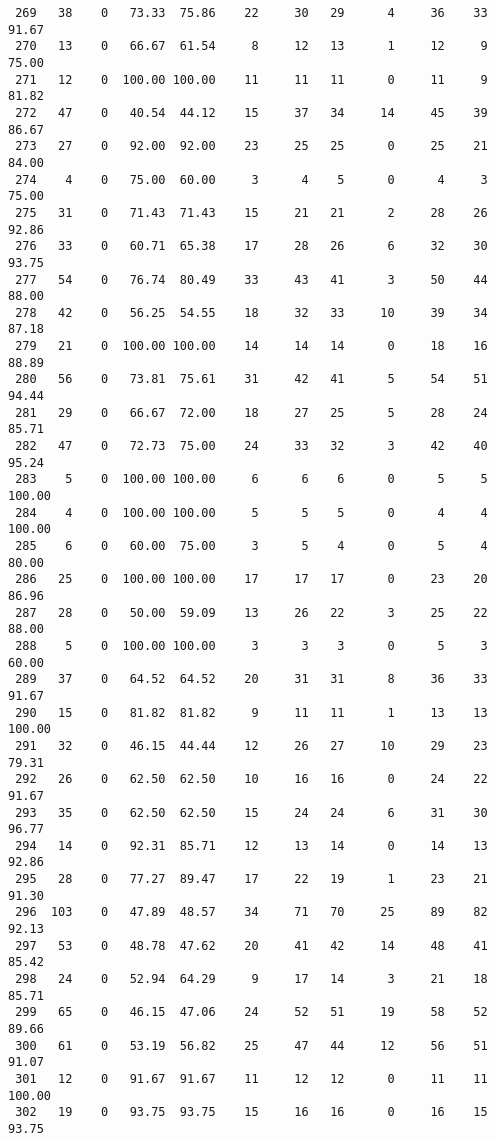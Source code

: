\begin{verbatim}
 269   38    0   73.33  75.86    22     30   29      4     36    33    91.67
 270   13    0   66.67  61.54     8     12   13      1     12     9    75.00
 271   12    0  100.00 100.00    11     11   11      0     11     9    81.82
 272   47    0   40.54  44.12    15     37   34     14     45    39    86.67
 273   27    0   92.00  92.00    23     25   25      0     25    21    84.00
 274    4    0   75.00  60.00     3      4    5      0      4     3    75.00
 275   31    0   71.43  71.43    15     21   21      2     28    26    92.86
 276   33    0   60.71  65.38    17     28   26      6     32    30    93.75
 277   54    0   76.74  80.49    33     43   41      3     50    44    88.00
 278   42    0   56.25  54.55    18     32   33     10     39    34    87.18
 279   21    0  100.00 100.00    14     14   14      0     18    16    88.89
 280   56    0   73.81  75.61    31     42   41      5     54    51    94.44
 281   29    0   66.67  72.00    18     27   25      5     28    24    85.71
 282   47    0   72.73  75.00    24     33   32      3     42    40    95.24
 283    5    0  100.00 100.00     6      6    6      0      5     5   100.00
 284    4    0  100.00 100.00     5      5    5      0      4     4   100.00
 285    6    0   60.00  75.00     3      5    4      0      5     4    80.00
 286   25    0  100.00 100.00    17     17   17      0     23    20    86.96
 287   28    0   50.00  59.09    13     26   22      3     25    22    88.00
 288    5    0  100.00 100.00     3      3    3      0      5     3    60.00
 289   37    0   64.52  64.52    20     31   31      8     36    33    91.67
 290   15    0   81.82  81.82     9     11   11      1     13    13   100.00
 291   32    0   46.15  44.44    12     26   27     10     29    23    79.31
 292   26    0   62.50  62.50    10     16   16      0     24    22    91.67
 293   35    0   62.50  62.50    15     24   24      6     31    30    96.77
 294   14    0   92.31  85.71    12     13   14      0     14    13    92.86
 295   28    0   77.27  89.47    17     22   19      1     23    21    91.30
 296  103    0   47.89  48.57    34     71   70     25     89    82    92.13
 297   53    0   48.78  47.62    20     41   42     14     48    41    85.42
 298   24    0   52.94  64.29     9     17   14      3     21    18    85.71
 299   65    0   46.15  47.06    24     52   51     19     58    52    89.66
 300   61    0   53.19  56.82    25     47   44     12     56    51    91.07
 301   12    0   91.67  91.67    11     12   12      0     11    11   100.00
 302   19    0   93.75  93.75    15     16   16      0     16    15    93.75

\end{verbatim}
